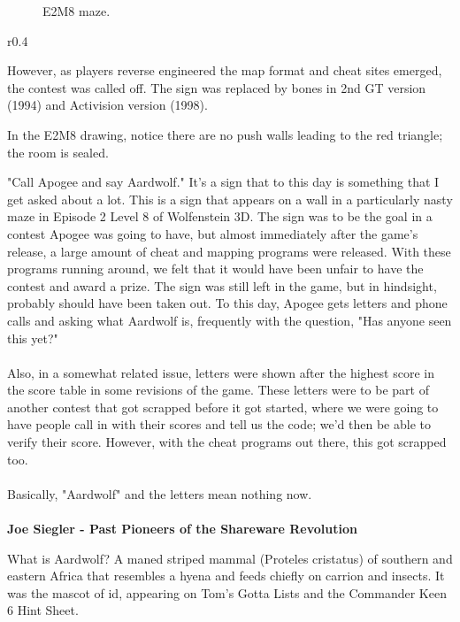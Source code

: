 \begin{figure}[H]
  \centering
 \caption{E2M8 maze.}
\end{figure}
\par
\begin{wrapfigure}[8]{r}{0.4\textwidth}
\vspace{-10pt}
\end{wrapfigure}
However, as players reverse engineered the map format and cheat sites emerged, the contest was called off. The sign was replaced by bones in 2nd GT version (1994) and Activision version (1998).\\
\par
In the E2M8 drawing, notice there are no push walls leading to the red triangle; the room is sealed.\\
\begin{fancyquotes}
"Call Apogee and say Aardwolf."  It's a sign that to this day is something
that I get asked about a lot.  This is a sign that appears on a wall in a
particularly nasty maze in Episode 2 Level 8 of Wolfenstein 3D.  The sign
was to be the goal in a contest Apogee was going to have, but almost
immediately after the game's release, a large amount of cheat and mapping
programs were released.  With these programs running around, we felt that
it would have been unfair to have the contest and award a prize.  The sign
was still left in the game, but in hindsight, probably should have been
taken out.  To this day, Apogee gets letters and phone calls and asking
what Aardwolf is, frequently with the question, "Has anyone seen this yet?"\\
\\
Also, in a somewhat related issue, letters were shown after the highest score
in the score table in some revisions of the game.  These letters were to be
part of another contest that got scrapped before it got started, where we were
going to have people call in with their scores and tell us the code; we'd then
be able to verify their score.  However, with the cheat programs out there,
this got scrapped too.\\
\\
Basically, "Aardwolf" and the letters mean nothing now.\\
\\
\textbf{Joe Siegler - Past Pioneers of the Shareware Revolution}
\end{fancyquotes}
\par
\bigskip
{} What is Aardwolf? A maned striped mammal (Proteles cristatus) of southern and eastern Africa that resembles a hyena and feeds chiefly on carrion and insects. It was the mascot of id, appearing on Tom's Gotta Lists and the Commander Keen 6 Hint Sheet.\\
\par

